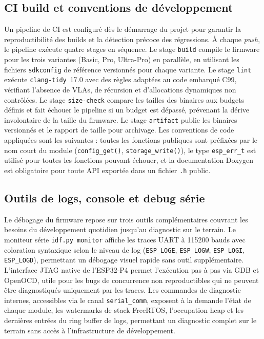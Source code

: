 \subsection{CI build et conventions de développement}
\label{subsec:ci}

Un pipeline de CI est configuré dès le démarrage du projet pour
garantir la reproductibilité des builds et la détection précoce des
régressions. À chaque \textit{push}, le pipeline exécute quatre
stages en séquence. Le stage \texttt{build} compile le firmware pour
les trois variantes (Basic, Pro, Ultra-Pro) en parallèle, en utilisant
les fichiers \texttt{sdkconfig} de référence versionnés pour chaque
variante. Le stage \texttt{lint} exécute \texttt{clang-tidy}~17.0
avec des règles adaptées au code embarqué C99, vérifiant l'absence
de VLAs, de récursion et d'allocations dynamiques non contrôlées.
Le stage \texttt{size-check} compare les tailles des binaires aux
budgets définis et fait échouer le pipeline si un budget est dépassé,
prévenant la dérive involontaire de la taille du firmware. Le stage
\texttt{artifact} publie les binaires versionnés et le rapport de
taille pour archivage. Les conventions de code appliquées sont les
suivantes : toutes les fonctions publiques sont préfixées par le nom
court du module (\texttt{config\_get()}, \texttt{storage\_write()}),
le type \texttt{esp\_err\_t} est utilisé pour toutes les fonctions
pouvant échouer, et la documentation Doxygen est obligatoire pour
toute API exportée dans un fichier \texttt{.h} public.

\subsection{Outils de logs, console et debug série}
\label{subsec:debug}

Le débogage du firmware repose sur trois outils complémentaires
couvrant les besoins du développement quotidien jusqu'au diagnostic
sur le terrain. Le moniteur série \texttt{idf.py monitor} affiche
les traces UART à 115200 bauds avec coloration syntaxique selon le
niveau de log (\texttt{ESP\_LOGE}, \texttt{ESP\_LOGW}, \texttt{ESP\_LOGI},
\texttt{ESP\_LOGD}), permettant un débogage visuel rapide sans outil
supplémentaire. L'interface JTAG native de l'ESP32-P4 permet
l'exécution pas à pas via GDB et OpenOCD, utile pour les bugs de
concurrence non reproductibles qui ne peuvent être diagnostiqués
uniquement par les traces. Les commandes de diagnostic internes,
accessibles via le canal \texttt{serial\_comm}, exposent à la demande
l'état de chaque module, les watermarks de stack FreeRTOS, l'occupation
heap et les dernières entrées du ring buffer de logs, permettant un
diagnostic complet sur le terrain sans accès à l'infrastructure de
développement.


